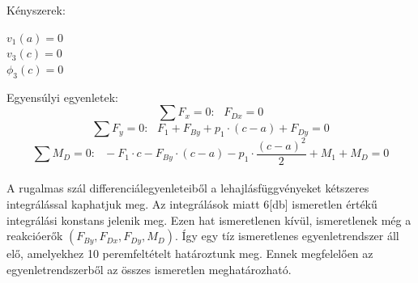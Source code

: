 \documentclass{article}
\begin{document}
		Kényszerek: 
		\begin{center}
			$v_1(a)=0$\\
			$v_3(c)=0$\\
			$\phi_3(c)=0$\\
		\end{center}
	
		Egyensúlyi egyenletek:
		\begin{equation}
			\sum{F_x=0} :\ \ \ F_{Dx}=0
		\end{equation}
		\begin{equation}
			\sum{F_y=0} :\ \ \ F_1+F_{By}+p_1\cdot(c-a)+F_{Dy}=0
		\end{equation}
		\begin{equation}
			\sum{M_D=0} :\ \ \ -F_1\cdot c-F_{By}\cdot(c-a)-p_1\cdot\frac{(c-a)^2}{2}+M_1+M_D=0
		\end{equation}\\[10pt]		
		A rugalmas szál differenciálegyenleteiből a lehajlásfüggvényeket kétszeres integrálással kaphatjuk meg. Az integrálások miatt 6[db] ismeretlen értékű integrálási konstans jelenik meg. Ezen hat ismeretlenen kívül, ismeretlenek még a reakcióerők $(F_{By}, F_{Dx}, F_{Dy}, M_{D})$.
		Így egy tíz ismeretlenes egyenletrendszer áll elő, amelyekhez 10 peremfeltételt határoztunk meg. Ennek megfelelően az egyenletrendszerből az összes ismeretlen meghatározható.
		
\end{document}
